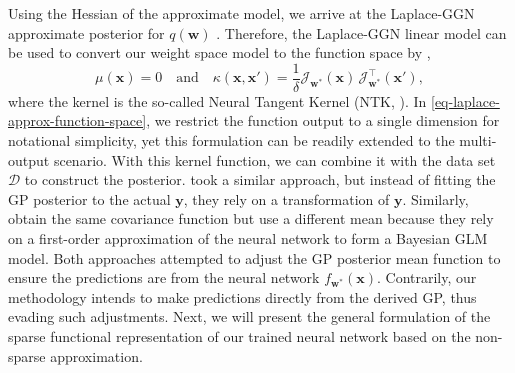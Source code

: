 \documentclass{article}
\newcommand{\dataset}{\ensuremath{\mathcal{D}}}
\newcommand{\weights}{\ensuremath{\mathbf{w}}}
\newcommand{\mbf}[1]{\mathbf{#1}}
\newcommand{\vx}{\mbf{x}}
\newcommand{\vy}{\mbf{y}}
\newcommand{\vw}{\mbf{w}}
\newcommand{\Jac}[2]{\mathcal{J}_{#1}(#2)}
\newcommand{\JacT}[2]{\mathcal{J}_{#1}^\top(#2)}
\newcommand{\GP}{\mathcal{GP}}
\begin{document}
Using the Hessian of the approximate model, we arrive at the Laplace-GGN approximate posterior for $q(\vw)$ . 
Therefore, the Laplace-GGN linear model can be used to convert our weight space model to the function space by ,
\begin{equation} 
\label{eq-laplace-approx-function-space} 
  \mu(\vx) =  0 \quad \text{and} \quad
  \kappa(\vx, \vx')
  = \frac{1}{\delta} \Jac{\weights^*}{\vx} \, \JacT{\weights^*}{\vx'}, 
\end{equation}
where the kernel is the so-called Neural Tangent Kernel (NTK, \cite{jacot2018neural}). In \cref{eq-laplace-approx-function-space}, we restrict the function output to a single dimension for notational simplicity, yet this formulation can be readily extended to the multi-output scenario. With this kernel function, we can combine it with the data set $\dataset$ to construct the posterior. 
%
\citet{khan2019approximate} took a similar approach, but instead of fitting the GP posterior to the actual $\vy$, they rely on a transformation of $\vy$. Similarly, \citet{immer2021improving} obtain the same covariance function but use a different mean because they rely on a first-order approximation of the neural network to form a Bayesian GLM model. Both approaches attempted to adjust the GP posterior mean function to ensure the predictions are from the neural network $f_{\vw^*}(\vx)$. 
Contrarily, our methodology intends to make predictions directly from the derived GP, thus evading such adjustments. Next, we will present the general formulation of the sparse functional representation of our trained neural network based on the non-sparse approximation. 
\end{document}
